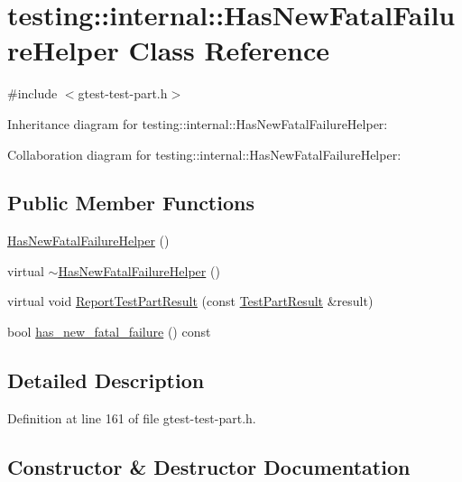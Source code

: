 \hypertarget{classtesting_1_1internal_1_1_has_new_fatal_failure_helper}{}\section{testing\+:\+:internal\+:\+:Has\+New\+Fatal\+Failure\+Helper Class Reference}
\label{classtesting_1_1internal_1_1_has_new_fatal_failure_helper}


{\ttfamily \#include $<$gtest-\/test-\/part.\+h$>$}



Inheritance diagram for testing\+:\+:internal\+:\+:Has\+New\+Fatal\+Failure\+Helper\+:


Collaboration diagram for testing\+:\+:internal\+:\+:Has\+New\+Fatal\+Failure\+Helper\+:
\subsection*{Public Member Functions}
\begin{DoxyCompactItemize}
\item 
\hyperlink{classtesting_1_1internal_1_1_has_new_fatal_failure_helper_a59190a7188db558c00b4c6bf9251859a}{Has\+New\+Fatal\+Failure\+Helper} ()
\item 
virtual \hyperlink{classtesting_1_1internal_1_1_has_new_fatal_failure_helper_a913b1bc7c372868c9b2dbb009044ee97}{$\sim$\+Has\+New\+Fatal\+Failure\+Helper} ()
\item 
virtual void \hyperlink{classtesting_1_1internal_1_1_has_new_fatal_failure_helper_a2d2e1faa1f3669b82810df97ac678a27}{Report\+Test\+Part\+Result} (const \hyperlink{classtesting_1_1_test_part_result}{Test\+Part\+Result} \&result)
\item 
bool \hyperlink{classtesting_1_1internal_1_1_has_new_fatal_failure_helper_ae137e639098071f11f531bbd72dde1c7}{has\+\_\+new\+\_\+fatal\+\_\+failure} () const 
\end{DoxyCompactItemize}


\subsection{Detailed Description}


Definition at line 161 of file gtest-\/test-\/part.\+h.



\subsection{Constructor \& Destructor Documentation}
